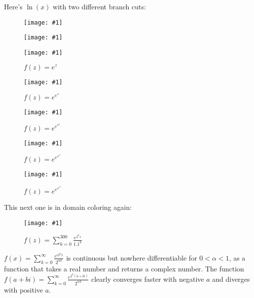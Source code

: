 \documentclass[xhtml, mathjax]{article}
\newcommand{\singleimage}[2] {
  \begin{figure}
    \centering
    \texttt{[image: \#1]}\par
    #2
  \end{figure}
}
\begin{document}
    Here's $\ln(x)$ with two different branch cuts:

    \singleimage{log_1.gif}{}

    \singleimage{log_2.gif}{}

    \singleimage{exp.gif}{$f(z)=e^z$}

    \singleimage{exp_2.gif}{$f(z)=e^{e^z}$}

    \singleimage{exp_3.gif}{$f(z)=e^{e^{e^z}}$}

    \singleimage{exp_4.gif}{$f(z)=e^{e^{e^{e^z}}}$}

    \singleimage{exp_5.gif}{$f(z)=e^{e^{e^{e^{e^z}}}}$}

    This next one is in domain coloring again:

    \singleimage{sin_series.gif}{$f(z)=\sum_{k=0}^{300} \frac{e^{2^k
    z}}{1.1^k}$}

    $f(x) = \sum_{k=0}^\infty \frac{e^{i2^kx}}{2^{\alpha k}}$ is continuous but
    nowhere differentiable for $0 < \alpha < 1$, as a function that takes a real
    number and returns a complex number. The function $f(a+bi) =
    \sum_{k=0}^\infty \frac{e^{2^k(a+bi)}}{2^{\alpha k}}$ clearly converges
    faster with negative $a$ and diverges with positive $a$.


    ~

    ~

    ~

    ~

    ~

    ~

  
\end{document}
